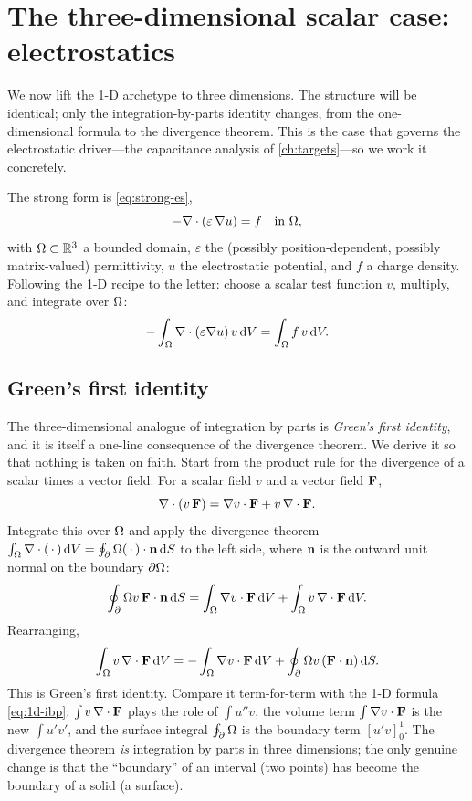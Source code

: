 \section{The three-dimensional scalar case: electrostatics}
\label{sec:3d-scalar}

We now lift the 1-D archetype to three dimensions. The structure will be
identical; only the integration-by-parts identity changes, from the
one-dimensional formula to the divergence theorem. This is the case that
governs the electrostatic driver---the capacitance analysis of
\cref{ch:targets}---so we work it concretely.

The strong form is \cref{eq:strong-es},
\[
  -\nabla\cdot(\varepsilon\,\nabla u) = f \quad\text{in } \Omega,
\]
with $\Omega\subset\mathbb{R}^3$ a bounded domain, $\varepsilon$ the (possibly
position-dependent, possibly matrix-valued) permittivity, $u$ the electrostatic
potential, and $f$ a charge density. Following the 1-D recipe to the letter:
choose a scalar test function $v$, multiply, and integrate over $\Omega$:
\begin{equation}
  -\int_\Omega \nabla\cdot(\varepsilon\nabla u)\,v\,\mathrm{d}V = \int_\Omega f\,v\,\mathrm{d}V.
  \label{eq:3d-weighted}
\end{equation}

\subsection{Green's first identity}

The three-dimensional analogue of integration by parts is \emph{Green's first
identity}, and it is itself a one-line consequence of the divergence theorem. We
derive it so that nothing is taken on faith. Start from the product rule for the
divergence of a scalar times a vector field. For a scalar field $v$ and a vector
field $\mathbf{F}$,
\begin{equation}
  \nabla\cdot(v\,\mathbf{F}) = \nabla v\cdot\mathbf{F} + v\,\nabla\cdot\mathbf{F}.
  \label{eq:prodrule}
\end{equation}
Integrate this over $\Omega$ and apply the divergence theorem
$\int_\Omega\nabla\cdot(\,\cdot\,)\,\mathrm{d}V=\oint_\partial\Omega(\,\cdot\,)\cdot\mathbf{n}\,\mathrm{d}S$ to the
left side, where $\mathbf{n}$ is the outward unit normal on the boundary $\partial\Omega$:
\[
  \oint_\partial\Omega v\,\mathbf{F}\cdot\mathbf{n}\,\mathrm{d}S
  = \int_\Omega \nabla v\cdot\mathbf{F}\,\mathrm{d}V + \int_\Omega v\,\nabla\cdot\mathbf{F}\,\mathrm{d}V.
\]
Rearranging,
\begin{equation}
  \int_\Omega v\,\nabla\cdot\mathbf{F}\,\mathrm{d}V
  = -\int_\Omega \nabla v\cdot\mathbf{F}\,\mathrm{d}V
  + \oint_\partial\Omega v\,(\mathbf{F}\cdot\mathbf{n})\,\mathrm{d}S.
  \label{eq:green1}
\end{equation}
This is Green's first identity. Compare it term-for-term with the 1-D formula
\cref{eq:1d-ibp}: $\int v\,\nabla\cdot\mathbf{F}$ plays the role of $\int u''v$, the
volume term $\int\nabla v\cdot\mathbf{F}$ is the new $\int u'v'$, and the surface
integral $\oint_\partial\Omega$ is the boundary term $[u'v]_0^1$. The divergence theorem
\emph{is} integration by parts in three dimensions; the only genuine change is
that the ``boundary'' of an interval (two points) has become the boundary of a
solid (a surface).

